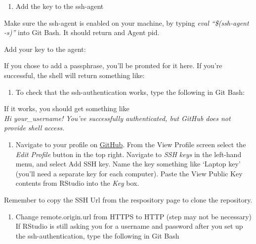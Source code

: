 \documentclass[12pt,]{article}
\providecommand{\tightlist}{%
  \setlength{\itemsep}{0pt}\setlength{\parskip}{0pt}}
\begin{document}
\begin{enumerate}
\def\labelenumi{\arabic{enumi}.}
\setcounter{enumi}{3}
\tightlist
\item
  Add the key to the ssh-agent
\end{enumerate}

Make sure the ssh-agent is enabled on your machine, by typing \emph{eval
``\$(ssh-agent -s)''} into Git Bash. It should return and Agent pid.

Add your key to the agent:

\colorbox{light-gray}{}

If you chose to add a passphrase, you'll be promted for it here. If
you're successful, the shell will return something like:

\colorbox{light-gray}{}

\begin{enumerate}
\def\labelenumi{\arabic{enumi}.}
\setcounter{enumi}{4}
\tightlist
\item
  To check that the ssh-authentication works, type the following in Git
  Bash:
\end{enumerate}

\colorbox{light-gray}{}

If it works, you should get something like\\
\emph{Hi your\_username! You've successfully authenticated, but GitHub
does not provide shell access.}

\begin{enumerate}
\def\labelenumi{\arabic{enumi}.}
\setcounter{enumi}{5}
\tightlist
\item
  Navigate to your profile on \href{www.github.com}{GitHub}. From the
  View Profile screen select the \emph{Edit Profile} button in the top
  right. Navigate to \emph{SSH keys} in the left-hand menu, and select
  Add SSH key. Name the key something like `Laptop key' (you'll need a
  separate key for each computer). Paste the View Public Key contents
  from RStudio into the \emph{Key} box.
\end{enumerate}

Remember to copy the SSH Url from the respository page to clone the
repository.

\begin{enumerate}
\def\labelenumi{\arabic{enumi}.}
\setcounter{enumi}{6}
\tightlist
\item
  Change remote.origin.url from HTTPS to HTTP (step may not be
  necessary) If RStudio is still asking you for a username and password
  after you set up the ssh-authentication, type the following in Git
  Bash
\end{enumerate}
\end{document}
